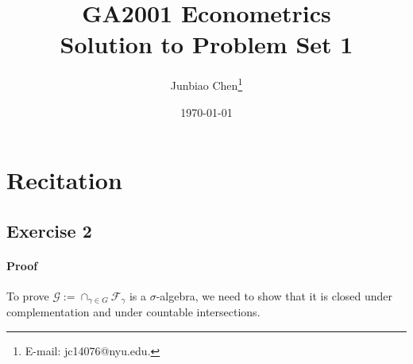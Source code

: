 \documentclass[11pt]{article}
\title{GA2001 Econometrics \\Solution to Problem Set 1}
\author{
Junbiao Chen\thanks{E-mail: jc14076@nyu.edu.}
}
\date{\today}
\theoremstyle{definition}
\theoremstyle{boldtitle} %
\numberwithin{equation}{section}
\numberwithin{figure}{section}
\numberwithin{table}{section}
\begin{document}
\section{Recitation}

\subsection{Exercise 2}
\paragraph{Proof}
To prove $\mathcal{G} := \cap_{\gamma \in G} \mathcal{F}_\gamma$ is a $\sigma$-algebra,
we need to show that it is closed under complementation and under countable intersections.



\end{document}
